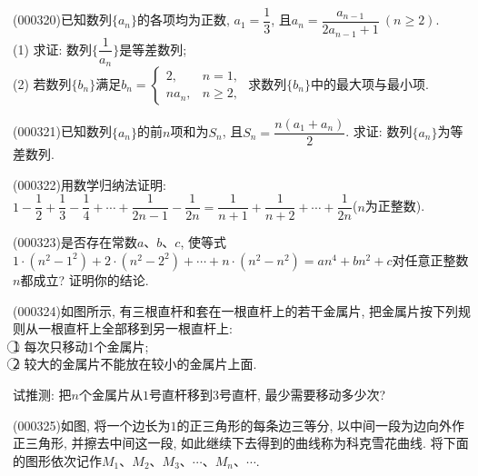 \item (000320)已知数列$\{a_n\}$的各项均为正数, $a_1=\dfrac 13$, 且$a_n=\dfrac{a_{n-1}}{2a_{n-1}+1} \ (n\ge 2)$.\\
(1) 求证: 数列$\{\dfrac 1{a_n}\}$是等差数列;\\
(2) 若数列$\{b_n\}$满足$b_n=\begin{cases}2, & n=1,\\ na_n, & n \ge 2,\end{cases}$ 求数列$\{b_n\}$中的最大项与最小项.
\item (000321)已知数列$\{a_n\}$的前$n$项和为$S_n$, 且$S_n=\dfrac{n(a_1+a_n)}2$. 求证: 数列$\{a_n\}$为等差数列.
\item (000322)用数学归纳法证明: $1-\dfrac12+\dfrac 13-\dfrac 14+\cdots +\dfrac{1}{2n-1}-\dfrac{1}{2n}=\dfrac{1}{n+1}+\dfrac{1}{n+2}+\cdots+\dfrac{1}{2n}$($n$为正整数).
\item (000323)是否存在常数$a$、$b$、$c$, 使等式$1\cdot (n^2-1^2)+2\cdot (n^2-2^2)+\cdots +n\cdot (n^2-n^2)=an^4+bn^2+c$对任意正整数$n$都成立? 证明你的结论.
\item (000324)如图所示, 有三根直杆和套在一根直杆上的若干金属片, 把金属片按下列规则从一根直杆上全部移到另一根直杆上:\\
\textcircled{1} 每次只移动1个金属片;\\
\textcircled{2} 较大的金属片不能放在较小的金属片上面.
\begin{center}
\end{center}
试推测: 把$n$个金属片从$1$号直杆移到$3$号直杆, 最少需要移动多少次?
\item (000325)如图, 将一个边长为$1$的正三角形的每条边三等分, 以中间一段为边向外作正三角形, 并擦去中间这一段, 如此继续下去得到的曲线称为科克雪花曲线. 将下面的图形依次记作$M_1$、$M_2$、$M_3$、$\cdots$、$M_n$、$\cdots$.
